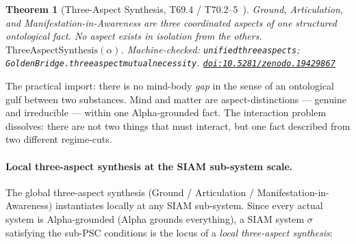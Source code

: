 \documentclass[11pt]{article}
\newtheorem{theorem}{Theorem}[section]
\theoremstyle{remark}
\newcommand{\lean}[1]{%
  \penalty-100
  \begingroup\def\_{\textunderscore\allowbreak}\texttt{#1}\endgroup}
\newcommand{\doi}[1]{\href{https://doi.org/#1}{\nolinkurl{doi:#1}}}
\begin{document}
\begin{center}
\end{center}

\begin{theorem}[Three-Aspect Synthesis, T69.4 / T70.2--5~\cite{SpivackNEMS69,SpivackNEMS70}]
Ground, Articulation, and Manifestation-in-Awareness are three coordinated aspects of
one structured ontological fact. No aspect exists in isolation from the others.\\
$\mathrm{ThreeAspectSynthesis}(\alpha)$. Machine-checked:
\lean{unified\allowbreak\_three\allowbreak\_aspects};
\lean{GoldenBridge.three\allowbreak\_aspect\allowbreak\_mutual\allowbreak\_necessity}.
\doi{10.5281/zenodo.19429867}
\end{theorem}

The practical import: there is no mind-body \emph{gap} in the sense of an ontological
gulf between two substances. Mind and matter are aspect-distinctions --- genuine and
irreducible --- within one Alpha-grounded fact. The interaction problem dissolves:
there are not two things that must interact, but one fact described from two different
regime-cuts.

\paragraph{Local three-aspect synthesis at the SIAM sub-system scale.}
The global three-aspect synthesis (Ground / Articulation / Manifestation-in-Awareness)
instantiates locally at any SIAM sub-system. Since every actual system is
Alpha-grounded (Alpha grounds everything), a SIAM system $\sigma$ satisfying the
sub-PSC conditions is the locus of a \emph{local three-aspect synthesis}:
\end{document}
